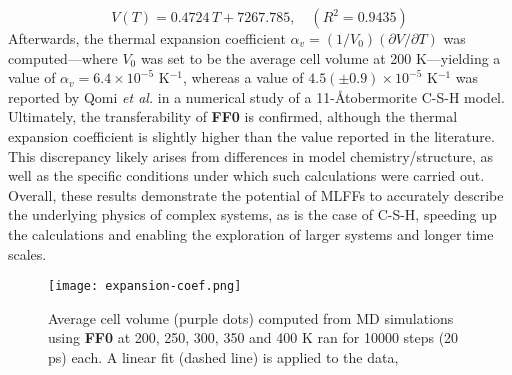 \begin{equation}
    \label{eq:thermal-expansion}
    V(T) = 0.4724\,T + 7267.785, \quad (R^2 = 0.9435)
\end{equation}
Afterwards, the thermal expansion coefficient $\alpha_v=(1/V_0)(\partial V/\partial T)$ was computed---where $V_0$ 
was set to be the average cell volume at 200 K---yielding a value of $\alpha_v = 6.4 \times 10^{-5}$ K$^{-1}$, whereas a value of $4.5(\pm 0.9) \times 10^{-5}$ K$^{-1}$ was reported by Qomi \emph{et al.}\supercite{AbdolhosseiniQomi2015} in a numerical study of a 11-\AA tobermorite C-S-H model. 
Ultimately, the transferability of \textbf{FF0} is confirmed, although the thermal expansion coefficient is slightly higher than the value reported in the literature. This discrepancy likely arises from differences in model chemistry/structure, as well as the specific conditions under which such calculations were carried out. Overall, these results demonstrate the potential of MLFFs to accurately describe the underlying physics of complex systems, as is the case of C-S-H, speeding up the calculations and enabling the exploration of larger systems and longer time scales.
\begin{figure}[H]
    \centering
    \texttt{[image: expansion-coef.png]}
    \caption{
    Average cell volume (purple dots) computed from MD simulations using \textbf{FF0} at 200, 250, 300, 350 and 400 K ran for 10000 steps (20 ps) each. A linear fit (dashed line) is applied to the data, 
    }
    \label{expansion-coef}
\end{figure}





